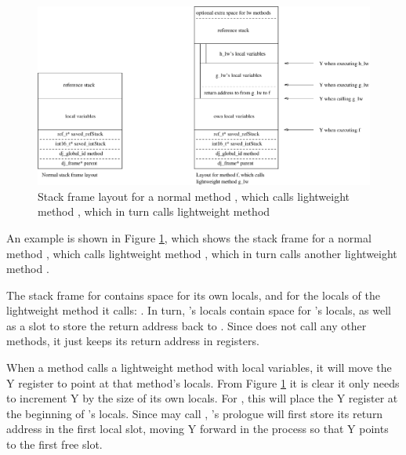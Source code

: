 
\begin{figure}
\centering
\includegraphics[width=0.95\linewidth]{stack-frame-lightweight-method.eps}
\caption{Stack frame layout for a normal method , which calls lightweight method , which in turn calls lightweight method }
\label{fig-stack-frame-lightweight-method}
\end{figure}

An example is shown in Figure \ref{fig-stack-frame-lightweight-method}, which shows the stack frame for a normal method , which calls lightweight method , which in turn calls another lightweight method .

The stack frame for  contains space for its own locals, and for the locals of the lightweight method it calls: . In turn, 's locals contain space for 's locals, as well as a slot to store the return address back to . Since  does not call any other methods, it just keeps its return address in registers.

When a method calls a lightweight method with local variables, it will move the Y register to point at that method's locals. From Figure \ref{fig-stack-frame-lightweight-method} it is clear it only needs to increment Y by the size of its own locals. For , this will place the Y register at the beginning of 's locals. Since  may call , 's prologue will first store its return address in the first local slot, moving Y forward in the process so that Y points to the first free slot.

